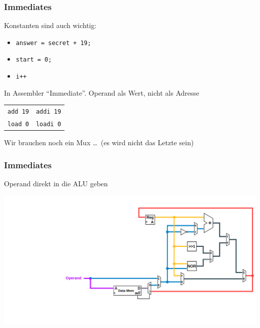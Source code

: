 \documentclass[t,aspectratio=169]{beamer}
\begin{document}
\begin{frame}
  \frametitle{Immediates}

  Konstanten sind auch wichtig:
  \begin{itemize}
  \item \texttt{answer = secret + 19;}
  \item \texttt{start = 0;}
  \item \texttt{i++}
  \end{itemize}

  \bigskip

  In Assembler \enquote{Immediate}. Operand als Wert, nicht als Adresse

  \medskip

  {\Large
    \begin{tabular}{ll}
      \texttt{add 19} & \texttt{addi 19} \\
      \texttt{load 0} & \texttt{loadi 0} \\
    \end{tabular}
  }

  \bigskip

  \pause
  Wir brauchen noch ein Mux \ldots\ (es wird nicht das Letzte sein)
\end{frame}

\begin{frame}
  \frametitle{Immediates}

  \strut{}Operand direkt in die ALU geben

  \begin{center}
    \includegraphics[width=.85\textwidth]{sch-immediate.pdf}
  \end{center}
\end{frame}
\end{document}

